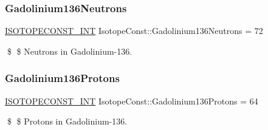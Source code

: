 \subsubsection{\texorpdfstring{Gadolinium136\+Neutrons}{Gadolinium136Neutrons}}
{\footnotesize\ttfamily \mbox{\hyperlink{group___isotope_const-_macros_ga5f18360b3e99483a35c32d789e62621c}{I\+S\+O\+T\+O\+P\+E\+C\+O\+N\+S\+T\+\_\+\+I\+NT}} Isotope\+Const\+::\+Gadolinium136\+Neutrons = 72}

\$ \$ Neutrons in Gadolinium-\/136. \mbox{\label{group___isotope_const-_gadolinium-_gd136_ga40f8bc38f4e399ad56b9b05cbeda7957}} 
\subsubsection{\texorpdfstring{Gadolinium136\+Protons}{Gadolinium136Protons}}
{\footnotesize\ttfamily \mbox{\hyperlink{group___isotope_const-_macros_ga5f18360b3e99483a35c32d789e62621c}{I\+S\+O\+T\+O\+P\+E\+C\+O\+N\+S\+T\+\_\+\+I\+NT}} Isotope\+Const\+::\+Gadolinium136\+Protons = 64}

\$ \$ Protons in Gadolinium-\/136. 